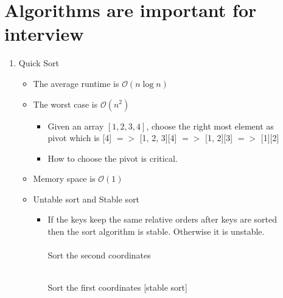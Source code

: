\documentclass{article}
\begin{document}
\section{Algorithms are important for interview}
\begin{enumerate}
\item Quick Sort 
    \begin{itemize}
    \item The average runtime is $\mathcal{O}(n\log{}n)$
    \item The worst case is $\mathcal{O}(n^2)$
        \begin{itemize}
        \item Given an array $[1, 2, 3, 4]$, choose the right most element as \\ 
              pivot which is [4] $=>$ [1, 2, 3][4] $=>$ [1, 2][3] $=>$ [1][2]
        \item How to choose the pivot is critical.
        \end{itemize} 
    \item Memory space is $\mathcal{O}(1)$ 
    \item Untable sort and Stable sort
        \begin{itemize}
        \item If the keys keep the same relative orders after keys are sorted \\ 
              then the sort algorithm is stable. Otherwise it is unstable. \\\\
              Sort the second coordinates \\ 
                \\

              Sort the first coordinates [stable sort]\\
                \\


\end{itemize}
\end{itemize}
\end{enumerate}
\end{document}
